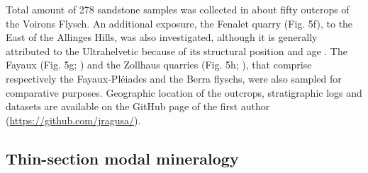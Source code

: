 \documentclass[twoside]{article}
\begin{document}
Total amount of 278 sandstone samples was collected in about fifty outcrops of the Voirons Flysch. An additional exposure, the Fenalet quarry (Fig. 5f), to the East of the Allinges Hills, was also investigated, although it is generally attributed to the Ultrahelvetic because of its structural position and age \citep{Gagnebin1944,Badoux1962a,Badoux1965b,Badoux1996}. The Fayaux (Fig. 5g; \citealp{Stuijvenberg1976}) and the Zollhaus quarries (Fig. 5h; \citealp{Bouma1962,Crimes1981}), that comprise respectively the Fayaux-Pléiades and the Berra flyschs, were also sampled for comparative purposes. Geographic location of the outcrops, stratigraphic logs and datasets are available on the GitHub page of the first author (\url{https://github.com/jragusa/}).

\subsection{Thin-section modal mineralogy}
\end{document}
